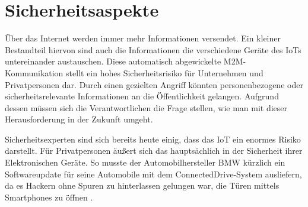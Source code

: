 \section{Sicherheitsaspekte}\label{s:Sicherheitsaspekte}

Über das Internet werden  immer mehr Informationen versendet. Ein kleiner Bestandteil hiervon sind auch die Informationen die verschiedene Geräte des \ac{IoT}s untereinander austauschen.
Diese automatisch abgewickelte \ac{M2M}-Kommunikation stellt ein hohes Sicherheitsrisiko für Unternehmen und Privatpersonen dar. Durch einen gezielten Angriff könnten personenbezogene oder sicherheitsrelevante Informationen an die Öffentlichkeit gelangen. Aufgrund dessen müssen sich die Verantwortlichen die Frage stellen, wie man mit dieser Herausforderung in der Zukunft umgeht. 

Sicherheitsexperten sind sich bereits heute einig, dass das \ac{IoT} ein enormes Risiko darstellt\cite{ws:iotsec}. Für Privatpersonen äußert sich das hauptsächlich in der Sicherheit ihrer Elektronischen Geräte. So musste der Automobilhersteller BMW kürzlich ein Softwareupdate für seine Automobile mit dem ConnectedDrive-System ausliefern, da es Hackern ohne Spuren zu hinterlassen gelungen war, die Türen mittels Smartphones zu öffnen \cite{ws:zeitbmw}.


